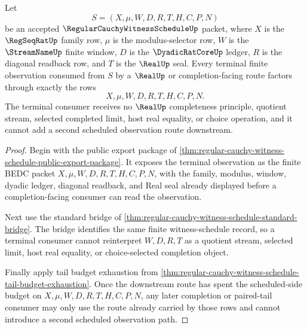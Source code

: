\begin{theorem}
\label{thm:regular-cauchy-witness-schedule-finite-observation-terminal-coverage}
Let
$$
S=(X,\mu,W,D,R,T,H,C,P,N)
$$
be an accepted $\RegularCauchyWitnessScheduleUp$ packet, where $X$ is the $\RegSeqRatUp$ family row, $\mu$ is the modulus-selector row, $W$ is the $\StreamNameUp$ finite window, $D$ is the $\DyadicRatCoreUp$ ledger, $R$ is the diagonal readback row, and $T$ is the $\RealUp$ seal. Every terminal finite observation consumed from $S$ by a $\RealUp$ or completion-facing route factors through exactly the rows
$$
X,\mu,W,D,R,T,H,C,P,N.
$$
The terminal consumer receives no $\RealUp$ completeness principle, quotient stream, selected completed limit, host real equality, or choice operation, and it cannot add a second scheduled observation route downstream.
\end{theorem}
\begin{proof}
Begin with the public export package of \autoref{thm:regular-cauchy-witness-schedule-public-export-package}. It exposes the terminal observation as the finite BEDC packet $X,\mu,W,D,R,T,H,C,P,N$, with the family, modulus, window, dyadic ledger, diagonal readback, and Real seal already displayed before a completion-facing consumer can read the observation.

Next use the standard bridge of \autoref{thm:regular-cauchy-witness-schedule-standard-bridge}. The bridge identifies the same finite witness-schedule record, so a terminal consumer cannot reinterpret $W,D,R,T$ as a quotient stream, selected limit, host real equality, or choice-selected completion object.

Finally apply tail budget exhaustion from \autoref{thm:regular-cauchy-witness-schedule-tail-budget-exhaustion}. Once the downstream route has spent the scheduled-side budget on $X,\mu,W,D,R,T,H,C,P,N$, any later completion or paired-tail consumer may only use the route already carried by those rows and cannot introduce a second scheduled observation path.
\end{proof}


